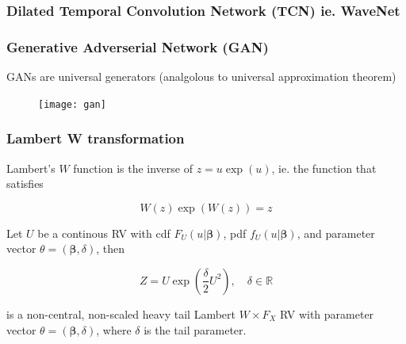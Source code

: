 \documentclass{beamer}
\newcommand{\Real}{\mathbb{R}}
\newcommand{\vect}[1]{\boldsymbol{#1}}
\begin{document}
\begin{frame}
    \frametitle{Dilated Temporal Convolution Network (TCN) ie. WaveNet}

    \begin{figure}
        \center
    \end{figure}

\end{frame}

\begin{frame}

    \frametitle{Generative Adverserial Network (GAN)}

    GANs are universal generators (analgolous to universal approximation theorem)

    \begin{figure}
        \center
        \texttt{[image: gan]}
    \end{figure}

\end{frame}

\begin{frame}

    \frametitle{Lambert W transformation}


Lambert's $W$ function is the inverse of $z=u\exp(u)$, ie. the function that satisfies

\begin{equation}
W(z)\exp(W(z))= z
\end{equation}

Let $U$ be a continous RV with cdf $F_U (u|\vect{\beta})$,
pdf $f_U(u|\vect{\beta})$, and parameter vector $\theta=(\vect{\beta},\delta)$, then

\begin{equation}
Z = U\exp\left(\frac{\delta}{2}U^2\right),\quad\delta\in\Real
\end{equation}

is a non-central, non-scaled heavy tail Lambert $W\times F_X$ RV with
parameter vector $\theta=(\vect{\beta},\delta)$, where $\delta$ is the
tail parameter.

\end{frame}
\end{document}
